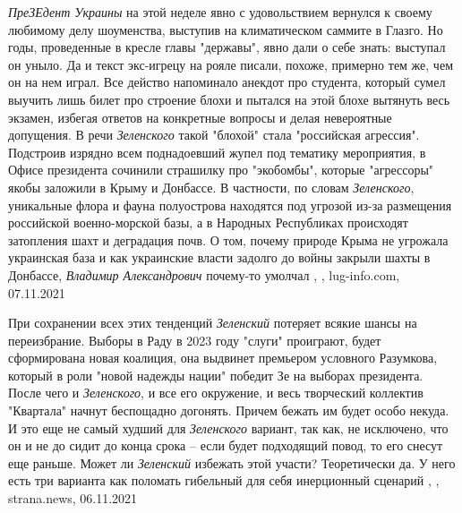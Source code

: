  
 
 
 
 

\emph{ПреЗЕдент Украины} на этой неделе явно с удовольствием вернулся к своему
любимому делу шоуменства, выступив на климатическом саммите в Глазго. Но годы,
проведенные в кресле главы "державы", явно дали о себе знать: выступал он
уныло.  Да и текст экс-игрецу на рояле писали, похоже, примерно тем же, чем он
на нем играл. Все действо напоминало анекдот про студента, который сумел
выучить лишь билет про строение блохи и пытался на этой блохе вытянуть весь
экзамен, избегая ответов на конкретные вопросы и делая невероятные допущения.
В речи \emph{Зеленского} такой "блохой" стала "российская агрессия". Подстроив
изрядно всем поднадоевший жупел под тематику мероприятия, в Офисе президента
сочинили страшилку про "экобомбы", которые "агрессоры" якобы заложили в Крыму и
Донбассе. В частности, по словам \emph{Зеленского}, уникальные флора и фауна
полуострова находятся под угрозой из-за размещения российской военно-морской
базы, а в Народных Республиках происходят затопления шахт и деградация почв. О
том, почему природе Крыма не угрожала украинская база и как украинские власти
задолго до войны закрыли шахты в Донбассе, \emph{Владимир Александрович} почему-то
умолчал
, 
, lug-info.com, 07.11.2021

При сохранении всех этих тенденций \emph{Зеленский} потеряет всякие шансы на
переизбрание. Выборы в Раду в 2023 году "слуги" проиграют, будет сформирована
новая коалиция, она выдвинет премьером условного Разумкова, который в роли
"новой надежды нации" победит Зе на выборах президента. После чего и
\emph{Зеленского}, и все его окружение, и весь творческий коллектив "Квартала" начнут
беспощадно догонять. Причем бежать им будет особо некуда. И это еще не самый
худший для \emph{Зеленского} вариант, так как, не исключено, что он и не до сидит до
конца срока – если будет подходящий повод, то его снесут еще раньше.  Может ли
\emph{Зеленский} избежать этой участи? Теоретически да.  У него есть три варианта как
поломать гибельный для себя инерционный сценарий
, 
, strana.news, 06.11.2021
